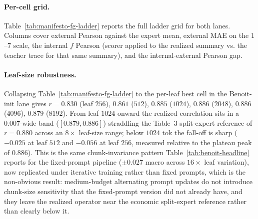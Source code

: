 \paragraph{Per-cell grid.} Table~\ref{tab:manifesto-fg-ladder} reports
the full ladder grid for both lanes. Columns cover external Pearson
against the expert mean, external MAE on the $1$--$7$ scale, the
internal $f$ Pearson (scorer applied to the realized summary vs. the
teacher trace for that same summary), and the internal-external Pearson gap.

\begin{table}[t]
    \centering
    \resizebox{\linewidth}{!}{}
    \caption{Per-cell ladder grid on the economic policy dimension
    (seven-point scale).
    Stage labels use the notation defined in
    Figure~\ref{fig:manifesto-fg-ladder-heatmaps}.
    Both lanes collapse inherited stages (where a later stage reused
    the preceding evaluation) into the first stage at which each
    distinct evaluation appeared. Bold external-$r$ values are the
    best cell within each lane; bold internal-external gap values are
    the tightest (closest to parity) within each
    lane.}\label{tab:manifesto-fg-ladder}
\end{table}

\paragraph{Leaf-size robustness.} Collapsing
Table~\ref{tab:manifesto-fg-ladder} to the per-leaf best cell in the
Benoit-init lane gives $r = 0.830$ (leaf $256$), $0.861$ ($512$),
$0.885$ ($1024$), $0.886$ ($2048$), $0.886$ ($4096$), $0.879$ ($8192$).
From leaf $1024$ onward the realized correlation sits in a $0.007$-wide
band ($[0.879, 0.886]$) straddling the \citet{BenoitEtAl2025} Table~3
split-expert reference of $r = 0.880$ across an $8\times$ leaf-size
range; below $1024$ tok the fall-off is sharp ($-0.025$ at leaf $512$
and $-0.056$ at leaf $256$, measured relative to the plateau peak of
$0.886$). This is the same chunk-invariance
pattern Table~\ref{tab:benoit-headline} reports for the fixed-prompt
pipeline ($\pm 0.027$ macro across $16\times$ leaf variation), now
replicated under iterative training rather than fixed prompts, which
is the non-obvious result: medium-budget alternating prompt updates do not
introduce chunk-size sensitivity that the fixed-prompt version did
not already have, and they leave the realized operator near the
economic split-expert reference rather than clearly below it.


